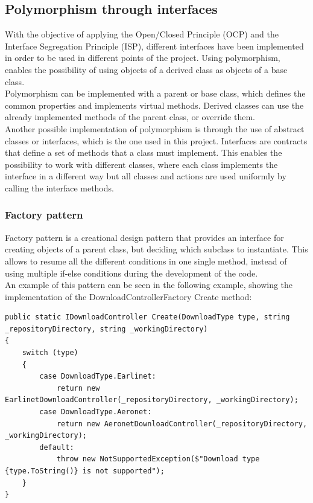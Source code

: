 \subsection{Polymorphism through interfaces}
With the objective of applying the Open/Closed Principle (OCP) and the Interface Segregation Principle (ISP), different interfaces have been implemented in order to be used in different points of the project. Using polymorphism, enables the possibility of using objects of a derived class as objects of a base class\cite{polymorphism}.\smallskip\\
Polymorphism can be implemented with a parent or base class, which defines the common properties and implements virtual methods. Derived classes can use the already implemented methods of the parent class, or override them.\smallskip\\
Another possible implementation of polymorphism is through the use of abstract classes or interfaces, which is the one used in this project. Interfaces are contracts that define a set of methods that a class must implement. This enables the possibility to work with different classes, where each class implements the interface in a different way but all classes and actions are used uniformly by calling the interface methods.
\subsubsection{Factory pattern}
Factory pattern is a creational design pattern that provides an interface for creating objects of a parent class, but deciding which subclass to instantiate\cite{factory_pattern}. This allows to resume all the different conditions in one single method, instead of using multiple if-else conditions during the development of the code.\smallskip\\
An example of this pattern can be seen in the following example, showing the implementation of the DownloadControllerFactory Create method:\smallskip   
\begin{lstlisting}
public static IDownloadController Create(DownloadType type, string _repositoryDirectory, string _workingDirectory)
{
    switch (type)
    {
        case DownloadType.Earlinet:
            return new EarlinetDownloadController(_repositoryDirectory, _workingDirectory);
        case DownloadType.Aeronet:
            return new AeronetDownloadController(_repositoryDirectory, _workingDirectory);
        default:
            throw new NotSupportedException($"Download type {type.ToString()} is not supported");
    }
}
\end{lstlisting}
